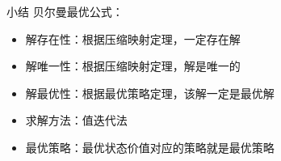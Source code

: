 \begin{frame}{小结}
    贝尔曼最优公式：
    \begin{itemize}
        \item 解存在性：根据压缩映射定理，一定存在解
        \item 解唯一性：根据压缩映射定理，解是唯一的
        \item 解最优性：根据最优策略定理，该解一定是最优解
        \item 求解方法：值迭代法
        \item 最优策略：最优状态价值对应的策略就是最优策略
    \end{itemize}
\end{frame}